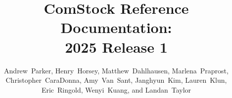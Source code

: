 \documentclass[]{nrel}
\title{ComStock Reference Documentation: \\ 2025 Release 1}
\author{\mbox{Andrew Parker}, \mbox{Henry Horsey}, \mbox{Matthew Dahlhausen}, \mbox{Marlena Praprost}, \mbox{Christopher CaraDonna}, \mbox{Amy Van Sant}, \mbox{Janghyun Kim}, \mbox{Lauren Klun}, \mbox{Eric Ringold}, \mbox{Wenyi Kuang}, and \mbox{Landan Taylor}}
\affil{National Renewable Energy Laboratory}
\begin{document}
\frontmatter





\mainmatter
\tableofcontents

\listoffigures

\listoftables




\label{chap:3_sampling}












\cleardoublepage
\label{sec:Bib}
\printbibliography[title={\LARGE References}]
\begin{appendices} %




\end{appendices}
\end{document}
